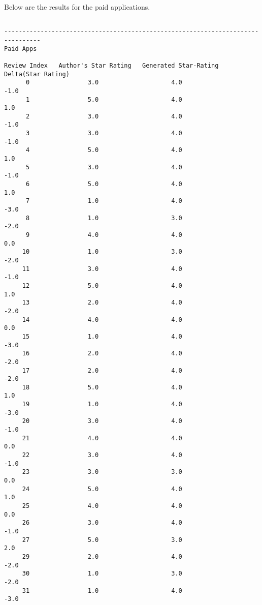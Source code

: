 \documentclass[11pt]{report} %
\begin{document}
Below are the results for the paid applications.

\begin{verbatim}

--------------------------------------------------------------------------------
Paid Apps

Review Index   Author's Star Rating   Generated Star-Rating   Delta(Star Rating)
      0                3.0                    4.0                   -1.0
      1                5.0                    4.0                    1.0
      2                3.0                    4.0                   -1.0
      3                3.0                    4.0                   -1.0
      4                5.0                    4.0                    1.0
      5                3.0                    4.0                   -1.0
      6                5.0                    4.0                    1.0
      7                1.0                    4.0                   -3.0
      8                1.0                    3.0                   -2.0
      9                4.0                    4.0                    0.0
     10                1.0                    3.0                   -2.0
     11                3.0                    4.0                   -1.0
     12                5.0                    4.0                    1.0
     13                2.0                    4.0                   -2.0
     14                4.0                    4.0                    0.0
     15                1.0                    4.0                   -3.0
     16                2.0                    4.0                   -2.0
     17                2.0                    4.0                   -2.0
     18                5.0                    4.0                    1.0
     19                1.0                    4.0                   -3.0
     20                3.0                    4.0                   -1.0
     21                4.0                    4.0                    0.0
     22                3.0                    4.0                   -1.0
     23                3.0                    3.0                    0.0
     24                5.0                    4.0                    1.0
     25                4.0                    4.0                    0.0
     26                3.0                    4.0                   -1.0
     27                5.0                    3.0                    2.0
     29                2.0                    4.0                   -2.0
     30                1.0                    3.0                   -2.0
     31                1.0                    4.0                   -3.0

\end{verbatim}
\end{document}
